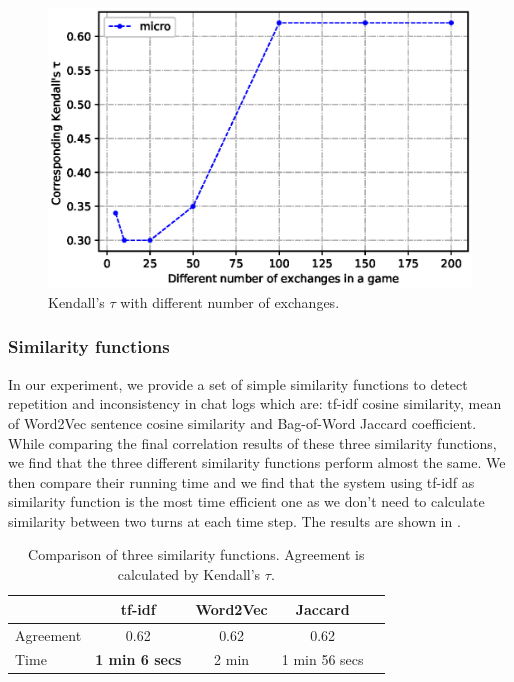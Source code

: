 \begin{figure}[th]
\centering
	\includegraphics[width=\columnwidth]{exchanges.eps}
\caption{Kendall's $\tau$ with different number of exchanges.}
\label{fig:exchanges}
\end{figure}

\subsubsection*{Similarity functions} 
In our experiment, we provide a set of simple similarity functions 
to detect repetition and inconsistency in chat logs which are: 
tf-idf cosine similarity, mean of Word2Vec sentence cosine similarity 
and Bag-of-Word Jaccard coefficient. While comparing the final correlation 
results of these three similarity functions, we find that 
the three different similarity functions perform almost the same. 
We then compare their running time and we find that the system
using tf-idf as similarity function is the most time efficient 
one as we don't need to calculate similarity between two turns at 
each time step. The results are shown in .

\begin{table}
\small
\centering
\begin{tabular}{lcccc}
\toprule
&tf-idf & Word2Vec & Jaccard \\ \midrule
Agreement & 0.62 &  0.62 & 0.62\\
Time &\textbf{ 1 min 6 secs} &  2 min & 1 min 56 secs\\ \bottomrule
\end{tabular}
\caption{Comparison of three similarity functions. Agreement is calculated by Kendall's $\tau$.}
\label{tab:similarity}
\end{table}  

